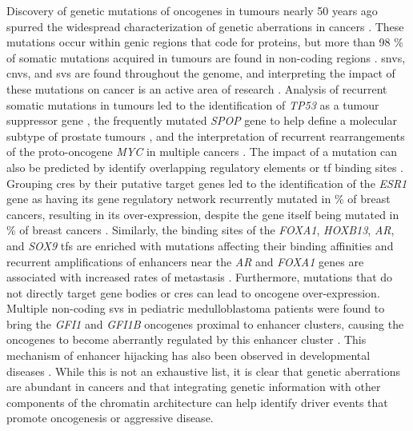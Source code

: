 Discovery of genetic mutations of oncogenes in tumours nearly 50 years ago spurred the widespread characterization of genetic aberrations in cancers \cite{croceOncogenesCancer2008,baileyComprehensiveCharacterizationCancer2018,weinsteinCancerGenomeAtlas2013,PancancerAnalysisWhole2020}.
These mutations occur within genic regions that code for proteins, but more than 98 \% of somatic mutations acquired in tumours are found in non-coding regions \cite{khuranaRoleNoncodingSequence2016}.
\Glspl{snv}, \glspl{cnv}, and \glspl{sv} are found throughout the genome, and interpreting the impact of these mutations on cancer is an active area of research \cite{mooreExpandedEncyclopaediasDNA2020,rheinbayAnalysesNoncodingSomatic2020,PancancerAnalysisWhole2020,zhangHighcoverageWholegenomeAnalysis2020}.
Analysis of recurrent somatic mutations in tumours led to the identification of \emph{TP53} as a tumour suppressor gene \cite{hollsteinP53MutationsHuman1991}, the frequently mutated \emph{SPOP} gene to help define a molecular subtype of prostate tumours \cite{barbieriExomeSequencingIdentifies2012}, and the interpretation of recurrent rearrangements of the proto-oncogene \emph{MYC} in multiple cancers \cite{meyerReflecting25Years2008}.
The impact of a mutation can also be predicted by identify overlapping regulatory elements or \gls{tf} binding sites \cite{mauranoWidespreadSitedependentBuffering2012,cowper-sal*lariBreastCancerRisk2012,kronEnhancerAlterationsCancer2014}.
Grouping \glspl{cre} by their putative target genes led to the identification of the \emph{ESR1} gene as having its gene regulatory network recurrently mutated in  \% of breast cancers, resulting in its over-expression, despite the gene itself being mutated in  \% of breast cancers \cite{baileyNoncodingSomaticInherited2016}.
Similarly, the binding sites of the \emph{FOXA1}, \emph{HOXB13}, \emph{AR}, and \emph{SOX9} \glspl{tf} are enriched with mutations affecting their binding affinities \cite{mazrooeiCistromePartitioningReveals2019} and recurrent amplifications of enhancers near the \emph{AR} and \emph{FOXA1} genes are associated with increased rates of metastasis \cite{quigleyGenomicHallmarksStructural2018,paroliaDistinctStructuralClasses2019}.
Furthermore, mutations that do not directly target gene bodies or \glspl{cre} can lead to oncogene over-expression.
Multiple non-coding \glspl{sv} in pediatric medulloblastoma patients were found to bring the \emph{GFI1} and \emph{GFI1B} oncogenes proximal to enhancer clusters, causing the oncogenes to become aberrantly regulated by this enhancer cluster \cite{northcottEnhancerHijackingActivates2014}.
This mechanism of enhancer hijacking has also been observed in developmental diseases \cite{lupianezDisruptionsTopologicalChromatin2015,allouNoncodingDeletionsIdentify2021}.
While this is not an exhaustive list, it is clear that genetic aberrations are abundant in cancers and that integrating genetic information with other components of the chromatin architecture can help identify driver events that promote oncogenesis or aggressive disease.

